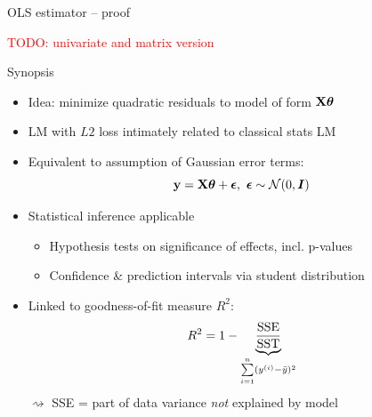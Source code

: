 \documentclass[11pt,compress,t,notes=noshow, xcolor=table]{beamer}
\begin{document}

\begin{vbframe}{OLS estimator -- proof}

\textcolor{red}{TODO: univariate and matrix version}

\end{vbframe}


\begin{vbframe}{Synopsis}

\begin{itemize}
    \item Idea: minimize quadratic residuals to model of form $\mathbf{X} \bm{\theta}$
    \item LM with $L2$ loss intimately related to classical stats LM
        \item Equivalent to assumption of Gaussian error terms: 
        $$\mathbf{y} = \mathbf{X} \bm{\theta} + \bm{\epsilon}, ~ \bm{\epsilon} \sim 
        \mathcal{N}(0, \boldsymbol{I})$$
        \item Statistical inference applicable
        \begin{itemize}
            \item Hypothesis tests on significance of effects, incl. p-values
            \item Confidence \& prediction intervals via student distribution
        \end{itemize}
        \item Linked to goodness-of-fit measure $R^2$:
        $$R^2 = 1 - \underbrace{\frac{\text{SSE}}{\text{SST}}}_{
        \sum\limits_{i=1}^n (y^{(i)} - \bar y)^2}$$
        $\rightsquigarrow$ SSE = part of data variance \textit{not} explained 
        by model
\end{itemize}

\end{vbframe}

\endlecture
\end{document}
